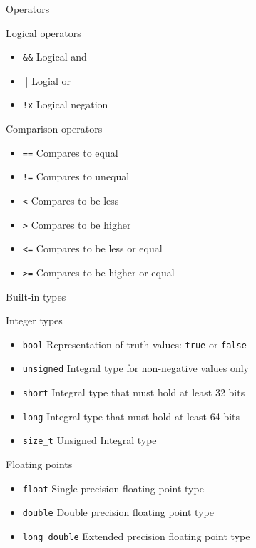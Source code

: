 \documentclass[12pt]{beamer}
\begin{document}
\begin{frame}{Operators}
\begin{block}{Logical operators}
\begin{itemize}
\item \lstinline|&&| Logical and
\item \lstinline|||| Logial or
\item \lstinline|!x| Logical negation 
\end{itemize}
\end{block}
\begin{block}{Comparison operators}
\begin{itemize}
\item \lstinline|==|  Compares to equal
\item \lstinline|!=| Compares to unequal
\item \lstinline|<| Compares to be less
\item \lstinline|>| Compares to be higher
\item \lstinline|<=| Compares to be less or equal
\item \lstinline|>=| Compares to be higher or equal
\end{itemize}
\end{block}
\end{frame}

\begin{frame}{Built-in types}
\begin{block}{Integer types}
\begin{itemize}
\item \lstinline|bool| Representation of truth values: \lstinline|true| or \lstinline|false| 
\item \lstinline|unsigned| Integral type for non-negative values only 
\item \lstinline|short| Integral type that must hold at least 32 bits
\item \lstinline|long| Integral type that must hold at least 64 bits
\item \lstinline|size_t| Unsigned Integral type
\end{itemize}
\end{block}

\begin{block}{Floating points}
\begin{itemize}
\item \lstinline|float| Single precision floating point type
\item \lstinline|double| Double precision floating point type
\item \lstinline|long double| Extended precision floating point type
\end{itemize}
\end{block}

\end{frame}
\end{document}
